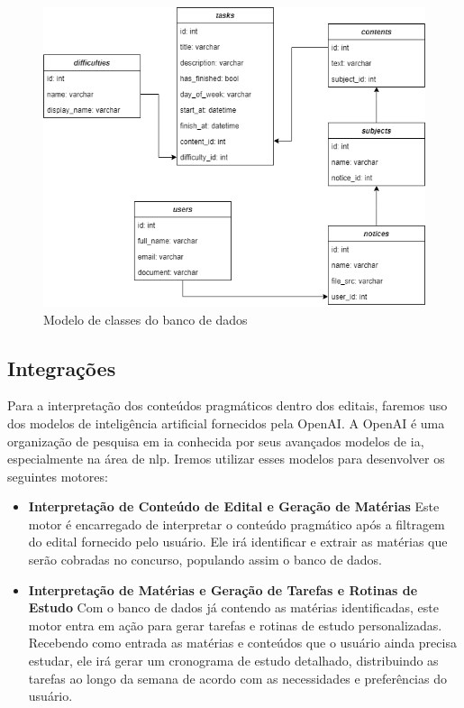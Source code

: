  \begin{figure}[!htb]
 	    \centering
 	    \caption{\label{logo}Modelo de classes do banco de dados}
 	    \includegraphics[width=15cm]{img/db-model.png}
\end{figure}
\FloatBarrier

\subsection{Integrações}
Para a interpretação dos conteúdos pragmáticos dentro dos editais, faremos uso dos modelos de inteligência artificial fornecidos pela OpenAI. A OpenAI é uma organização de pesquisa em \acs{ia} conhecida por seus avançados modelos de \acs{ia}, especialmente na área de  \ac{nlp}. Iremos utilizar esses modelos para desenvolver os seguintes motores:

\begin{itemize}
\item \textbf{Interpretação de Conteúdo de Edital e Geração de Matérias} \newline
Este motor é encarregado de interpretar o conteúdo pragmático após a filtragem do edital fornecido pelo usuário. Ele irá identificar e extrair as matérias que serão cobradas no concurso, populando assim o banco de dados.

\item \textbf{Interpretação de Matérias e Geração de Tarefas e Rotinas de Estudo} \newline
 Com o banco de dados já contendo as matérias identificadas, este motor entra em ação para gerar tarefas e rotinas de estudo personalizadas. Recebendo como entrada as matérias e conteúdos que o usuário ainda precisa estudar, ele irá gerar um cronograma de estudo detalhado, distribuindo as tarefas ao longo da semana de acordo com as necessidades e preferências do usuário.
\end{itemize}

